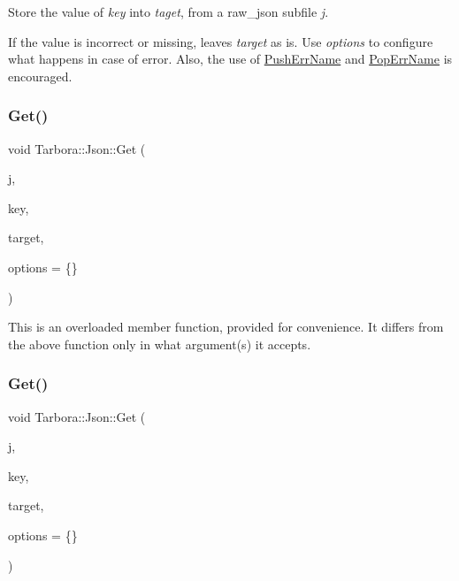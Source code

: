 Store the value of {\itshape key} into {\itshape taget}, from a raw\+\_\+json subfile {\itshape j}. 

If the value is incorrect or missing, leaves {\itshape target} as is. Use {\itshape options} to configure what happens in case of error. Also, the use of \hyperlink{classTarbora_1_1Json_a061eac4f16dac3b9b3a26a66de0ea8f0}{Push\+Err\+Name} and \hyperlink{classTarbora_1_1Json_a14019f06d3bd76edd6a6e78134519d11}{Pop\+Err\+Name} is encouraged. \mbox{\label{classTarbora_1_1Json_a488bdf866cc1df65b964752543f6c04c}} 
\subsubsection{\texorpdfstring{Get()}{Get()}\hspace{0.1cm}{\footnotesize\ttfamily [8/18]}}
{\footnotesize\ttfamily void Tarbora\+::\+Json\+::\+Get (\begin{DoxyParamCaption}\item[{raw\+\_\+json}]{j,  }\item[{const char $\ast$}]{key,  }\item[{bool $\ast$}]{target,  }\item[{\hyperlink{structTarbora_1_1JsonOptions}{Json\+Options}}]{options = {\ttfamily \{\}} }\end{DoxyParamCaption})}

This is an overloaded member function, provided for convenience. It differs from the above function only in what argument(s) it accepts. \mbox{\label{classTarbora_1_1Json_ae9c3713f12b22742e82699da53dc34d9}} 
\subsubsection{\texorpdfstring{Get()}{Get()}\hspace{0.1cm}{\footnotesize\ttfamily [9/18]}}
{\footnotesize\ttfamily void Tarbora\+::\+Json\+::\+Get (\begin{DoxyParamCaption}\item[{raw\+\_\+json}]{j,  }\item[{const char $\ast$}]{key,  }\item[{int $\ast$}]{target,  }\item[{\hyperlink{structTarbora_1_1JsonOptions}{Json\+Options}}]{options = {\ttfamily \{\}} }\end{DoxyParamCaption})}

